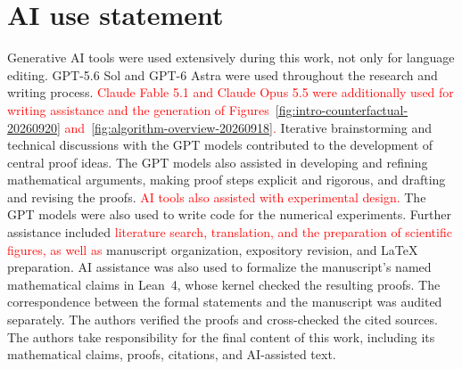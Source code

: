 \section*{AI use statement}
\label{sec:ai-use}

Generative AI tools were used extensively during this work, not only for
language editing.  GPT-5.6 Sol and GPT-6 Astra were used throughout the
research and writing process.  \textcolor{red}{Claude Fable 5.1 and
Claude Opus 5.5 were additionally used for writing assistance and the generation of
Figures~\ref{fig:intro-counterfactual-20260920}
and~\ref{fig:algorithm-overview-20260918}.}
Iterative brainstorming and technical discussions
with the GPT models contributed to the development of central proof ideas.
The GPT models also assisted in developing and refining mathematical arguments,
making proof steps explicit and rigorous, and drafting and revising
the proofs.  \textcolor{red}{AI tools also assisted with experimental design.}
The GPT models were also used to write code for the numerical
experiments.  Further assistance included \textcolor{red}{literature search,
translation, and the preparation of scientific figures, as well as}
manuscript organization,
expository revision, and \LaTeX{} preparation.
AI assistance was also used to formalize the manuscript's named mathematical
claims in Lean~4, whose kernel checked the resulting proofs.
The correspondence between the formal statements and the manuscript was
audited separately.
The authors verified the proofs and cross-checked the cited sources.
The authors take responsibility for the final content of this work,
including its mathematical claims, proofs, citations, and AI-assisted text.
